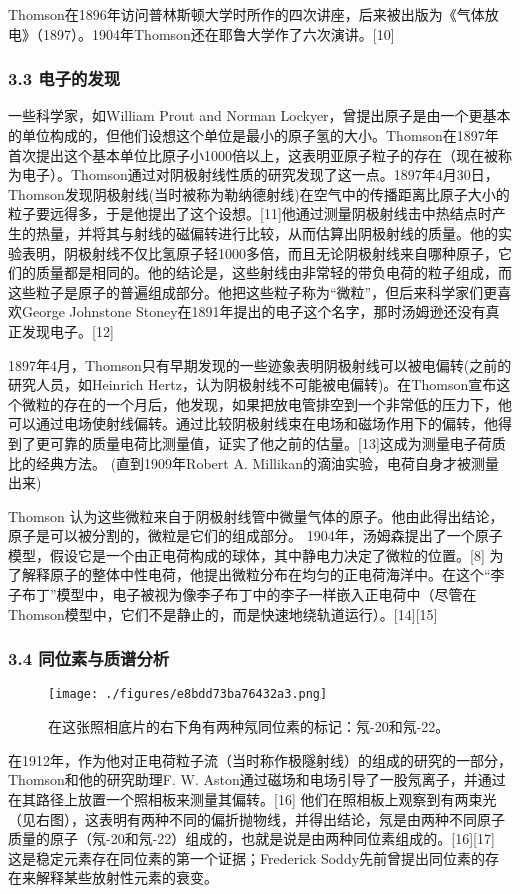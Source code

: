 Thomson在1896年访问普林斯顿大学时所作的四次讲座，后来被出版为《气体放电》（1897）。1904年Thomson还在耶鲁大学作了六次演讲。[10]

\subsubsection{3.3 电子的发现}
一些科学家，如William Prout and Norman Lockyer，曾提出原子是由一个更基本的单位构成的，但他们设想这个单位是最小的原子氢的大小。Thomson在1897年首次提出这个基本单位比原子小1000倍以上，这表明亚原子粒子的存在（现在被称为电子）。Thomson通过对阴极射线性质的研究发现了这一点。1897年4月30日，Thomson发现阴极射线(当时被称为勒纳德射线)在空气中的传播距离比原子大小的粒子要远得多，于是他提出了这个设想。[11]他通过测量阴极射线击中热结点时产生的热量，并将其与射线的磁偏转进行比较，从而估算出阴极射线的质量。他的实验表明，阴极射线不仅比氢原子轻1000多倍，而且无论阴极射线来自哪种原子，它们的质量都是相同的。他的结论是，这些射线由非常轻的带负电荷的粒子组成，而这些粒子是原子的普遍组成部分。他把这些粒子称为“微粒”，但后来科学家们更喜欢George Johnstone Stoney在1891年提出的电子这个名字，那时汤姆逊还没有真正发现电子。[12]

1897年4月，Thomson只有早期发现的一些迹象表明阴极射线可以被电偏转(之前的研究人员，如Heinrich Hertz，认为阴极射线不可能被电偏转)。在Thomson宣布这个微粒的存在的一个月后，他发现，如果把放电管排空到一个非常低的压力下，他可以通过电场使射线偏转。通过比较阴极射线束在电场和磁场作用下的偏转，他得到了更可靠的质量电荷比测量值，证实了他之前的估量。[13]这成为测量电子荷质比的经典方法。 (直到1909年Robert A. Millikan的滴油实验，电荷自身才被测量出来)

Thomson 认为这些微粒来自于阴极射线管中微量气体的原子。他由此得出结论，原子是可以被分割的，微粒是它们的组成部分。 1904年，汤姆森提出了一个原子模型，假设它是一个由正电荷构成的球体，其中静电力决定了微粒的位置。[8] 为了解释原子的整体中性电荷，他提出微粒分布在均匀的正电荷海洋中。在这个“李子布丁”模型中，电子被视为像李子布丁中的李子一样嵌入正电荷中（尽管在Thomson模型中，它们不是静止的，而是快速地绕轨道运行）。[14][15]

\subsubsection{3.4 同位素与质谱分析}
\begin{figure}[ht]
\centering
\texttt{[image: ./figures/e8bdd73ba76432a3.png]}
\caption{在这张照相底片的右下角有两种氖同位素的标记：氖-20和氖-22。} \label{fig_Joseph_1}
\end{figure}
在1912年，作为他对正电荷粒子流（当时称作极隧射线）的组成的研究的一部分，Thomson和他的研究助理F. W. Aston通过磁场和电场引导了一股氖离子，并通过在其路径上放置一个照相板来测量其偏转。[16] 他们在照相板上观察到有两束光（见右图），这表明有两种不同的偏折抛物线，并得出结论，氖是由两种不同原子质量的原子（氖-20和氖-22）组成的，也就是说是由两种同位素组成的。[16][17] 这是稳定元素存在同位素的第一个证据；Frederick Soddy先前曾提出同位素的存在来解释某些放射性元素的衰变。

